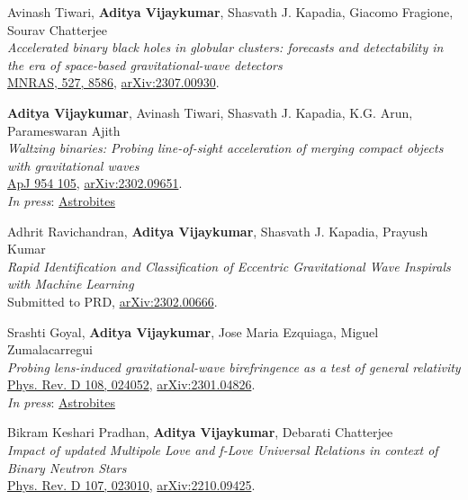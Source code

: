 \begin{etaremune}
	\item
	\student  Avinash Tiwari, \primary \textbf{Aditya Vijaykumar}, Shasvath J. Kapadia, Giacomo Fragione, Sourav Chatterjee  \\
	\textit{Accelerated binary black holes in globular clusters: forecasts and detectability in the era of space-based gravitational-wave detectors}\\
	\href{https://academic.oup.com/mnras/article/527/3/8586/7459933}{MNRAS, 527, 8586}, \href{https://arxiv.org/abs/2307.00930}{arXiv:2307.00930}.

	\item
	\textbf{Aditya Vijaykumar}, \student Avinash Tiwari, Shasvath J. Kapadia, K.G. Arun, Parameswaran Ajith  \\
	\textit{Waltzing binaries: Probing line-of-sight acceleration of merging compact objects with gravitational waves}\\
	\href{https://iopscience.iop.org/article/10.3847/1538-4357/acd77d}{ApJ 954 105}, \href{https://arxiv.org/abs/2302.09651}{arXiv:2302.09651}.\\
    \textit{In press}: \href{https://astrobites.org/2023/03/17/grab-doppler-dance-partner/}{Astrobites}
	
	\item
	\student Adhrit Ravichandran, \textbf{Aditya Vijaykumar}, Shasvath J. Kapadia, Prayush Kumar  \\
	\textit{Rapid Identification and Classification of Eccentric Gravitational Wave Inspirals with Machine Learning}\\
	Submitted to PRD, \href{https://arxiv.org/abs/2302.00666}{arXiv:2302.00666}.
	
	\item
	Srashti Goyal, \textbf{Aditya Vijaykumar}, Jose Maria Ezquiaga, Miguel Zumalacarregui \\
	\textit{Probing lens-induced gravitational-wave birefringence as a test of general relativity}\\
	\href{https://journals.aps.org/prd/abstract/10.1103/PhysRevD.108.024052}{Phys. Rev. D 108, 024052}, \href{https://arxiv.org/abs/2301.04826}{arXiv:2301.04826}.\\
    \textit{In press}: \href{https://astrobites.org/2023/04/11/gravitational-waves-a-la-general-relativity-or-scrambled/}{Astrobites}


    \item 
	Bikram Keshari Pradhan, \textbf{Aditya Vijaykumar}, Debarati Chatterjee \\
	\textit{Impact of updated Multipole Love and f-Love Universal Relations in context of Binary Neutron Stars}\\
	\href{https://journals.aps.org/prd/abstract/10.1103/PhysRevD.107.023010}{Phys. Rev. D 107, 023010}, \href{https://arxiv.org/abs/2210.09425}{arXiv:2210.09425}.
 

\end{etaremune}
